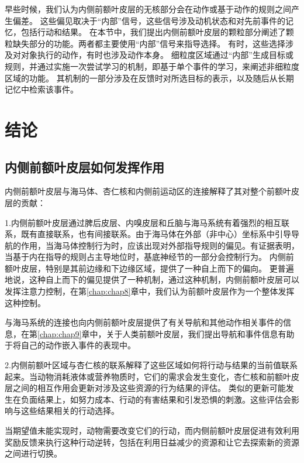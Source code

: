 早些时候，我们认为内侧前额叶皮层的无核部分会在动作或基于动作的规则之间产生偏差。
这些偏见取决于“内部”信号，这些信号涉及动机状态和对先前事件的记忆，包括行动和结果。
在本节中，我们提出内侧前额叶皮层的颗粒部分阐述了颗粒缺失部分的功能。两者都主要使用“内部”信号来指导选择。
有时，这些选择涉及对对象执行的动作，有时也涉及动作本身。
细粒度区域通过“内部”生成目标或规则，并通过实施一次尝试学习的机制，即基于单个事件的学习，来阐述非细粒度区域的功能。
其机制的一部分涉及在反馈时对所选目标的表示，以及随后从长期记忆中检索该事件。\par



\section{结论}

\subsection{内侧前额叶皮层如何发挥作用}

内侧前额叶皮层与海马体、杏仁核和内侧前运动区的连接解释了其对整个前额叶皮层的贡献：\par

1.内侧前额叶皮层通过脾后皮层、内嗅皮层和丘脑与海马系统有着强烈的相互联系，既有直接联系，也有间接联系。由于海马体在外部（非中心）坐标系中引导导航的作用，当海马体控制行为时，应该出现对外部指导规则的偏见。有证据表明，当基于内在指导的规则占主导地位时，基底神经节的一部分会控制行为\cite{packard1996inactivation}。
内侧前额叶皮层，特别是其前边缘和下边缘区域，提供了一种自上而下的偏向。
更普遍地说，这种自上而下的偏见提供了一种机制，通过这种机制，内侧前额叶皮层可以发挥注意力控制，在第\ref{chap:chap8}章中，我们认为前额叶皮层作为一个整体发挥这种控制。\par


与海马系统的连接也向内侧前额叶皮层提供了有关导航和其他动作相关事件的信息，在第\ref{chap:chap9}章中，关于人类前额叶皮层，我们提出导航和事件信息有助于将自己的动作嵌入事件的表现中。\par


2.内侧前额叶区域与杏仁核的联系解释了这些区域如何将行动与结果的当前值联系起来。当动物消耗液体或营养物质时，它们的需求会发生变化，杏仁核和前额叶皮层之间的相互作用会更新对涉及这些资源的行为结果的评估。
类似的更新可能发生在负面结果上，如努力成本、行动的有害结果和引发恐惧的刺激。这些评估会影响与这些结果相关的行动选择。\par


当期望值未能实现时，动物需要改变它们的行动，而内侧前额叶皮层促进有效利用奖励反馈来执行这种行动逆转，包括在利用日益减少的资源和让它去探索新的资源之间进行切换。\par


